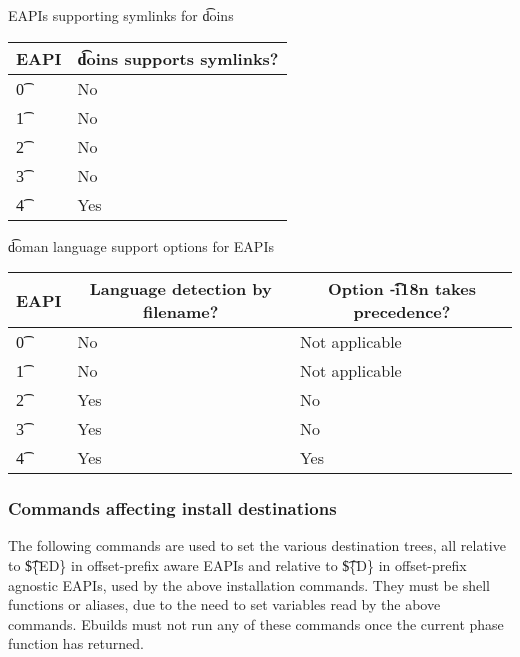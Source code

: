 \begin{centertable}{EAPIs supporting symlinks for \t{doins}} \label{tab:doins-table}
    \begin{tabular}{ l l }
        \toprule
            \multicolumn{1}{c}{\textbf{EAPI}} &
            \multicolumn{1}{c}{\textbf{\t{doins} supports symlinks?}} \\
            \midrule
    \t{0} & No \\
    \t{1} & No \\
    \t{2} & No \\
    \t{3} & No \\
    \t{4} & Yes \\
    \bottomrule
    \end{tabular}
\end{centertable}

\begin{centertable}{\t{doman} language support options for EAPIs}
    \label{tab:doman-table}
    \begin{tabular}{ l l l }
        \toprule
            \multicolumn{1}{c}{\textbf{EAPI}} &
            \multicolumn{1}{c}{\textbf{Language detection by filename?}} &
            \multicolumn{1}{c}{\textbf{Option \t{-i18n} takes precedence?}} \\
            \midrule
    \t{0} & No & Not applicable \\
    \t{1} & No & Not applicable \\
    \t{2} & Yes & No \\
    \t{3} & Yes & No \\
    \t{4} & Yes & Yes \\
    \bottomrule
    \end{tabular}
\end{centertable}

\subsubsection{Commands affecting install destinations}
The following commands are used to set the various destination trees, all relative to \t{\$\{ED\}} in
offset-prefix aware EAPIs and relative to \t{\$\{D\}} in offset-prefix agnostic EAPIs, used by the
above installation commands. They must be shell functions or aliases, due to the need to set variables
read by the above commands. Ebuilds must not run any of these commands once the current phase function
has returned.

